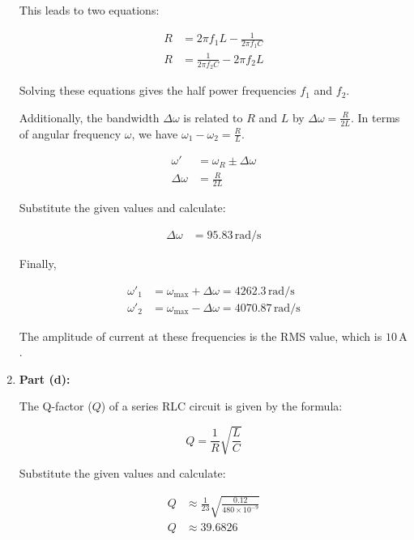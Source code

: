 \documentclass[journal,12pt,twocolumn]{IEEEtran}
\theoremstyle{remark}
\begin{document}
\begin{enumerate}
    This leads to two equations:

    \begin{align}
        R &= 2\pi f_1 L - \frac{1}{2\pi f_1 C} \\
        R &= \frac{1}{2\pi f_2 C} - 2\pi f_2 L
    \end{align}

    Solving these equations gives the half power frequencies \(f_1\) and \(f_2\).

    Additionally, the bandwidth \(\Delta\omega\) is related to \(R\) and \(L\) by \(\Delta\omega = \frac{R}{2L}\). In terms of angular frequency \(\omega\), we have \(\omega_1 - \omega_2 = \frac{R}{L}\).

    \begin{align}
        \omega' &= \omega_R \pm \Delta\omega \\
        \Delta\omega &= \frac{R}{2L}
    \end{align}

    Substitute the given values and calculate:

    \begin{align}
        \Delta\omega &= 95.83 \, \text{rad/s}
    \end{align}

    Finally,

    \begin{align}
        \omega'_1 &= \omega_{\text{max}} + \Delta\omega = 4262.3 \, \text{rad/s} \\
        \omega'_2 &= \omega_{\text{max}} - \Delta\omega = 4070.87 \, \text{rad/s}
    \end{align}

    The amplitude of current at these frequencies is the RMS value, which is \(10 \, \text{A}\).

    \item \textbf{Part (d):}

    The Q-factor (\(Q\)) of a series RLC circuit is given by the formula:

    \[Q = \frac{1}{R} \sqrt{\frac{L}{C}} \]

    Substitute the given values and calculate:

    \begin{align}
        Q &\approx \frac{1}{23} \sqrt{\frac{0.12}{480 \times 10^{-9}}} \\
        Q &\approx 39.6826 
    \end{align}
\end{enumerate}
\end{document}
